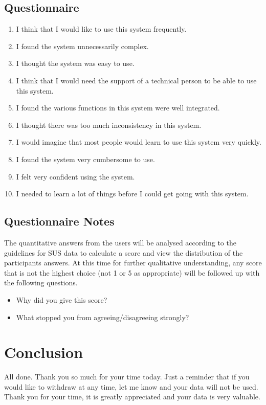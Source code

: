 \documentclass[a4 paper, 10pt]{article}
\begin{document}
    \subsection*{Questionnaire}
    \begin{multicols}{2}   
        \begin{enumerate}
            \item I think that I would like to use this system frequently.
            \item I found the system unnecessarily complex.
            \item I thought the system was easy to use.
            \item I think that I would need the support of a technical person to be able to use this system.
            \item I found the various functions in this system were well integrated.
            \item I thought there was too much inconsistency in this system.
            \item I would imagine that most people would learn to use this system very quickly.
            \item I found the system very cumbersome to use.
            \item I felt very confident using the system.
            \item I needed to learn a lot of things before I could get going with this system.
        \end{enumerate}
    \end{multicols}  

    \subsection*{Questionnaire Notes}
    The quantitative answers from the users will be analysed according to the guidelines for SUS data to calculate a score and view the distribution of the participants answers. At this time for further qualitative understanding, any score that is not the highest choice (not 1 or 5 as appropriate) will be followed up with the following questions.
    \begin{itemize}
        \item Why did you give this score?
        \item What stopped you from agreeing/disagreeing strongly?
    \end{itemize} 

\section*{Conclusion}
    \begin{itshape}
        All done. Thank you so much for your time today. Just a reminder that if you would like to withdraw at any time, let me know and your data will not be used. Thank you for your time, it is greatly appreciated and your data is very valuable.
    \end{itshape}
\end{document}
